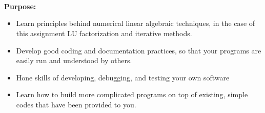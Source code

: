 \documentclass{article}
\begin{document}
~\\~\\~\\
\textbf{Purpose:}  
\begin{itemize}
  \item Learn principles behind numerical linear algebraic techniques, in the case of this assignment LU factorization and iterative methods.  
  \item Develop good coding and documentation practices, so that your programs are easily run and understood by others.  
  \item Hone skills of developing, debugging, and testing your own software
  \item Learn how to build more complicated programs on top of existing, simple codes that have been provided to you.
\end{itemize}

\pagebreak
\end{document}
